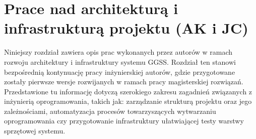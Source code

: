 \chapter{Prace nad architekturą i infrastrukturą projektu (AK i JC)}
\label{cha:infra}

\graphicspath{{4_infrastructure/static/}}

Niniejszy rozdział zawiera opis prac wykonanych przez autorów w ramach rozwoju architektury i infrastruktury systemu GGSS. Rozdział ten stanowi bezpośrednią kontynuację pracy inżynierskiej autorów, gdzie przygotowane zostały pierwsze wersje rozwijanych w ramach pracy magisterskiej rozwiązań. Przedstawione tu informację dotyczą szerokiego zakresu zagadnień związanych z inżynierią oprogramowania, takich jak: zarządzanie strukturą projektu oraz jego zależnościami, automatyzacja procesów towarzyszących wytwarzaniu oprogramowania czy przygotowanie infrastruktury ułatwiającej testy warstwy sprzętowej systemu. 







